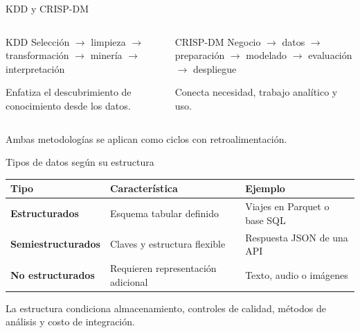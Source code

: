 \documentclass[aspectratio=169,11pt]{beamer}
\begin{document}
\begin{frame}{KDD y CRISP-DM}
  \begin{columns}[T]
      \begin{block}{KDD}
        \centering\small Selección $\rightarrow$ limpieza $\rightarrow$ transformación $\rightarrow$ minería $\rightarrow$ interpretación
        \vspace{0.6em}

        Enfatiza el descubrimiento de conocimiento desde los datos.
      \end{block}
      \begin{block}{CRISP-DM}
        \centering\small Negocio $\rightarrow$ datos $\rightarrow$ preparación $\rightarrow$ modelado $\rightarrow$ evaluación $\rightarrow$ despliegue
        \vspace{0.6em}

        Conecta necesidad, trabajo analítico y uso.
      \end{block}
  \end{columns}
  \vfill
  \centering\alert{Ambas metodologías se aplican como ciclos con retroalimentación.}
\end{frame}

\begin{frame}{Tipos de datos según su estructura}
  \small
  \begin{tabularx}{\textwidth}{>{\bfseries}p{} X X}
    \toprule
    Tipo & Característica & Ejemplo \\
    \midrule
    Estructurados & Esquema tabular definido & Viajes en Parquet o base SQL \\
    Semiestructurados & Claves y estructura flexible & Respuesta JSON de una API \\
    No estructurados & Requieren representación adicional & Texto, audio o imágenes \\
    \bottomrule
  \end{tabularx}
  \vfill
  La estructura condiciona almacenamiento, controles de calidad, métodos de análisis y costo de integración.
\end{frame}
\end{document}
